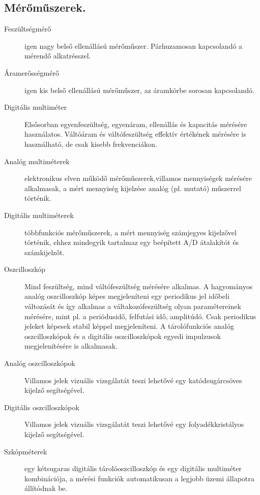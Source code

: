 \subsection{Mérőműszerek.}
\begin{description}
	\item[Feszültségmérő] igen nagy belső ellenállású mérőműszer. Párhuzamosan kapcsolandó a mérendő alkatrésszel.
	\item[Áramerősségmérő] igen kis belső ellenállású mérőműszer, az áramkörbe sorosan kapcsolandó.
	\item[Digitális multiméter] Elsősorban egyenfeszültség, egyenáram, ellenállás és kapacitás mérésére használatos. Váltóáram és váltófeszültség effektív értékének mérésére is használható, de csak kisebb frekvenciákon.
	\item[Analóg multiméterek] elektronikus elven működő mérőműszerek,villamos mennyiségek mérésére alkalmasak, a mért mennyiség kijelzése analóg (pl. mutató) műszerrel történik.
	\item[Digitális multiméterek] többfunkciós mérőműszerek, a mért mennyiség számjegyes kijelzővel történik, ehhez mindegyik tartalmaz egy beépített A/D átalakítót és számkijelzőt.
	\item[Oszcilloszkóp] Mind feszültség, mind váltófeszültség mérésére alkalmas. A hagyományos analóg oszcilloszkóp képes megjeleníteni egy periodikus jel időbeli változását és így alkalmas a váltakozófeszültség olyan paramétereinek mérésére, mint pl. a periódusidő, felfutási idő, amplitúdó. Csak periodikus jeleket képesek stabil képpel megjeleníteni. A tárolófunkciós analóg oszcilloszkópok és a digitális oszcilloszkópok egyedi impulzusok megjelenítésére is alkalmasak.
	\item[Analóg oszcilloszkópok] Villamos jelek vizuális vizsgálatát teszi lehetővé egy katódsugárcsöves kijelző segítségével.
	\item[Digitális oszcilloszkópok] Villamos jelek vizuális vizsgálatát teszi lehetővé egy folyadékkristályos kijelző segítségével.
	\item[Szkópméterek] egy kétsugaras digitális tárolóoszcilloszkóp és egy digitális multiméter kombinációja, a mérési funkciók automatikusan a legjobb üzemi állapotra állítódnak be.
\end{description}